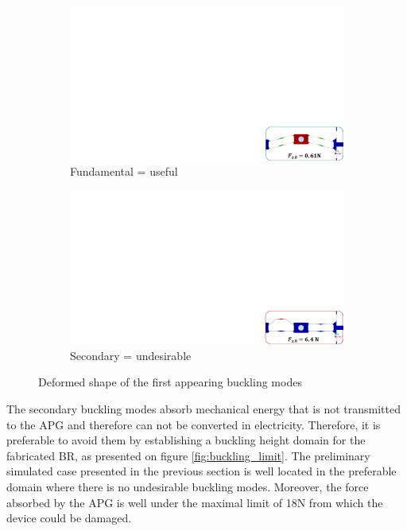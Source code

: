 \documentclass[3p,twocolumn,preprint]{elsarticle}
\def \hfillx {\hspace*{ -\linewidth} \hfill} %
\begin{document}
\begin{figure}[!htb]
	\begin{center}
		\begin{subfigure}[t]{0.48\linewidth}
			\captionsetup{justification=centering}
			\includegraphics[trim={24.1cm 0cm 0cm 14.8cm},clip,width=\linewidth]{figures/buckling_fundamental.pdf}
			\caption{Fundamental = useful}
			\label{fig:buckling_fundamental}
		\end{subfigure}
		\hfillx
		\begin{subfigure}[t]{0.48\linewidth}
			\captionsetup{justification=centering}
			\includegraphics[trim={24.1cm 0cm 0cm 14.8cm},clip,width=\linewidth]{figures/buckling_secondary.pdf}
			\caption{Secondary = undesirable}
			\label{fig:buckling_secondary}
		\end{subfigure}
		\caption{Deformed shape of the first appearing buckling modes}
		\label{fig:Buckling_deformed_shapes}
	\end{center}
\end{figure}
The secondary buckling modes absorb mechanical energy that is not transmitted to the APG and therefore can not be converted in electricity. Therefore, it is preferable to avoid them by establishing a buckling height domain for the fabricated BR, as presented on figure \ref{fig:buckling_limit}. The preliminary simulated case presented in the previous section is well located in the preferable domain where there is no undesirable buckling modes. Moreover, the force absorbed by the APG is well under the maximal limit of 18N from which the device could be damaged.
\end{document}
